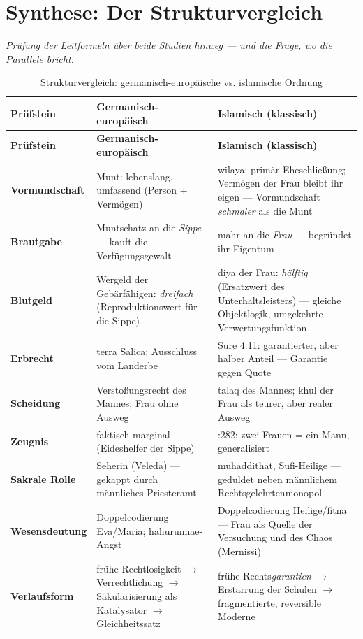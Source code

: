\documentclass[11pt,a4paper,ngerman]{scrartcl}
\begin{document}
\section{Synthese: Der Strukturvergleich}
\noindent\textit{Prüfung der Leitformeln über beide Studien hinweg --- und die Frage, wo die Parallele bricht.}
\medskip

\begin{small}
\begin{longtable}{>{\raggedright\arraybackslash}p{}>{\raggedright\arraybackslash}p{}>{\raggedright\arraybackslash}p{}}
\caption{Strukturvergleich: germanisch-europäische vs. islamische Ordnung}\\
\toprule
\textbf{Prüfstein} & \textbf{Germanisch-europäisch} & \textbf{Islamisch (klassisch)}\\
\midrule
\endfirsthead
\toprule
\textbf{Prüfstein} & \textbf{Germanisch-europäisch} & \textbf{Islamisch (klassisch)}\\
\midrule
\endhead
\textbf{Vormundschaft} & Munt: lebenslang, umfassend (Person + Vermögen) & wilaya: primär Eheschließung; Vermögen der Frau bleibt ihr eigen --- Vormundschaft \emph{schmaler} als die Munt \\
\addlinespace[2pt]
\textbf{Brautgabe} & Muntschatz an die \emph{Sippe} --- kauft die Verfügungsgewalt & mahr an die \emph{Frau} --- begründet ihr Eigentum \\
\addlinespace[2pt]
\textbf{Blutgeld} & Wergeld der Gebärfähigen: \emph{dreifach} (Reproduktionswert für die Sippe) & diya der Frau: \emph{hälftig} (Ersatzwert des Unterhaltsleisters) --- gleiche Objektlogik, umgekehrte Verwertungsfunktion \\
\addlinespace[2pt]
\textbf{Erbrecht} & terra Salica: Ausschluss vom Landerbe & Sure 4:11: garantierter, aber halber Anteil --- Garantie gegen Quote \\
\addlinespace[2pt]
\textbf{Scheidung} & Verstoßungsrecht des Mannes; Frau ohne Ausweg & talaq des Mannes; khul der Frau als teurer, aber realer Ausweg \\
\addlinespace[2pt]
\textbf{Zeugnis} & faktisch marginal (Eideshelfer der Sippe) & 2:282: zwei Frauen = ein Mann, generalisiert \\
\addlinespace[2pt]
\textbf{Sakrale Rolle} & Seherin (Veleda) --- gekappt durch männliches Priesteramt & muhaddithat, Sufi-Heilige --- geduldet neben männlichem Rechtsgelehrtenmonopol \\
\addlinespace[2pt]
\textbf{Wesensdeutung} & Doppelcodierung Eva/Maria; haliurunnae-Angst & Doppelcodierung Heilige/fitna --- Frau als Quelle der Versuchung und des Chaos (Mernissi) \\
\addlinespace[2pt]
\textbf{Verlaufsform} & frühe Rechtlosigkeit \(\rightarrow\) Verrechtlichung \(\rightarrow\) Säkularisierung als Katalysator \(\rightarrow\) Gleichheitssatz & frühe Rechts\emph{garantien} \(\rightarrow\) Erstarrung der Schulen \(\rightarrow\) fragmentierte, reversible Moderne \\
\bottomrule
\end{longtable}
\end{small}
\end{document}
